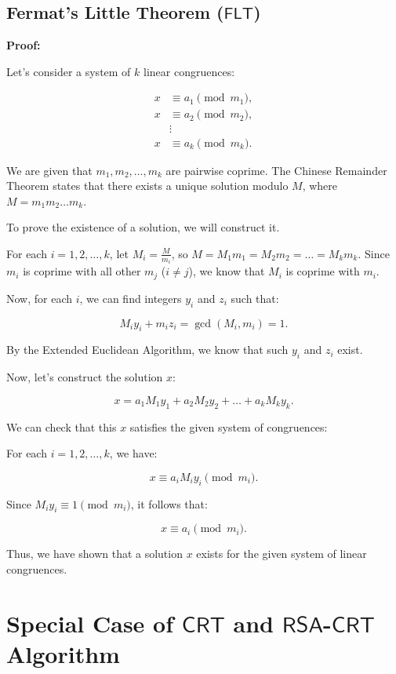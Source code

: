 \documentclass{article}
\newcommand{\rsa}{\mathsf{RSA}}
\theoremstyle{definition}
\begin{document}
	
	\subsection{Fermat's Little Theorem ($\mathsf{FLT}$)}
	\textbf{Proof:}
	
	Let's consider a system of $k$ linear congruences:
	
	\begin{align*}
	x &\equiv a_1 \pmod{m_1}, \\
	x &\equiv a_2 \pmod{m_2}, \\
	&\vdots \\
	x &\equiv a_k \pmod{m_k}.
	\end{align*}
	
	We are given that $m_1, m_2, \dots, m_k$ are pairwise coprime. The Chinese Remainder Theorem states that there exists a unique solution modulo $M$, where $M = m_1m_2\dots m_k$.
	
	To prove the existence of a solution, we will construct it.
	
	For each $i = 1, 2, \dots, k$, let $M_i = \frac{M}{m_i}$, so $M = M_1m_1 = M_2m_2 = \dots = M_km_k$. Since $m_i$ is coprime with all other $m_j$ ($i \neq j$), we know that $M_i$ is coprime with $m_i$.
	
	Now, for each $i$, we can find integers $y_i$ and $z_i$ such that:
	
	$$
	M_i y_i + m_i z_i = \gcd(M_i, m_i) = 1.
	$$
	
	By the Extended Euclidean Algorithm, we know that such $y_i$ and $z_i$ exist.
	
	Now, let's construct the solution $x$:
	
	$$
	x = a_1 M_1 y_1 + a_2 M_2 y_2 + \dots + a_k M_k y_k.
	$$
	
	We can check that this $x$ satisfies the given system of congruences:
	
	For each $i = 1, 2, \dots, k$, we have:
	
	$$
	x \equiv a_i M_i y_i \pmod{m_i}.
	$$
	
	Since $M_i y_i \equiv 1 \pmod{m_i}$, it follows that:
	
	$$
	x \equiv a_i \pmod{m_i}.
	$$
	
	Thus, we have shown that a solution $x$ exists for the given system of linear congruences.
	\newpage
	
	\section{Special Case of $\mathsf{CRT}$ and $\rsa$-$\mathsf{CRT}$ Algorithm}
	
\end{document}
